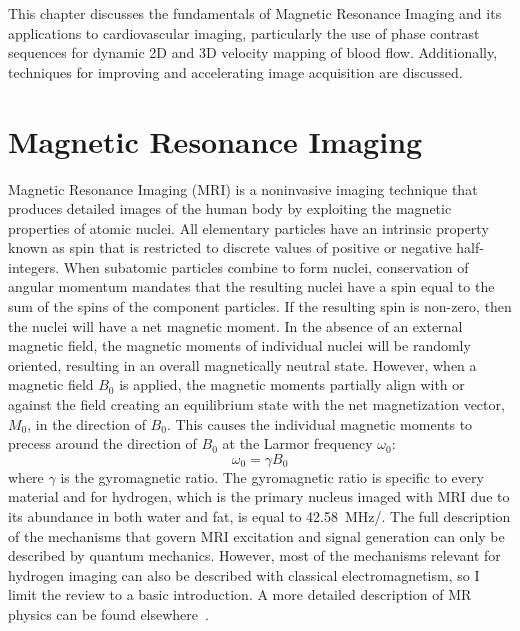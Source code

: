 This chapter discusses the fundamentals of Magnetic Resonance Imaging and its applications to cardiovascular imaging, particularly the use of phase contrast sequences for dynamic 2D and 3D velocity mapping of blood flow. Additionally, techniques for improving and accelerating image acquisition are discussed.
\section{Magnetic Resonance Imaging}\label{sec:mri}
Magnetic Resonance Imaging (MRI) is a noninvasive imaging technique that produces detailed images of the human body by exploiting the magnetic properties of atomic nuclei. All elementary particles have an intrinsic property known as spin that is restricted to discrete values of positive or negative half-integers. When subatomic particles combine to form nuclei, conservation of angular momentum mandates that the resulting nuclei have a spin equal to the sum of the spins of the component particles. If the resulting spin is non-zero, then the nuclei will have a net magnetic moment. In the absence of an external magnetic field, the magnetic moments of individual nuclei will be randomly oriented, resulting in an overall magnetically neutral state. However, when a magnetic field $B_0$ is applied, the magnetic moments partially align with or against the field creating an equilibrium state with the net magnetization vector, $M_0$, in the direction of $B_0$. This causes the individual magnetic moments to precess around the direction of $B_0$ at the Larmor frequency $\omega_0$:
\begin{equation}
    \omega_0=\gamma B_0
    \label{eq:larmor}
\end{equation}
where $\gamma$ is the gyromagnetic ratio. The gyromagnetic ratio is specific to every material and for hydrogen, which is the primary nucleus imaged with MRI due to its abundance in both water and fat, is equal to \qty{42.58}{\MHz/\T}. The full description of the mechanisms that govern MRI excitation and signal generation can only be described by quantum mechanics. However, most of the mechanisms relevant for hydrogen imaging can also be described with classical electromagnetism, so I limit the review to a basic introduction. A more detailed description of MR physics can be found elsewhere~\cite{mamourianPracticalMRPhysics2010, mooreReviewKeyConcepts2017}.


